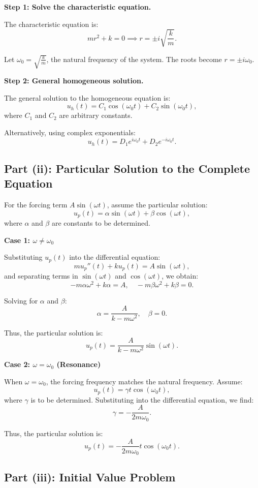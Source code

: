 \documentclass[a4paper]{report}
\begin{document}
\textbf{Step 1: Solve the characteristic equation.}

The characteristic equation is:
\[
	m r^2 + k = 0 \implies r = \pm i \sqrt{\frac{k}{m}}.
\]

Let \(\omega_0 = \sqrt{\frac{k}{m}}\), the natural frequency of the system. The roots become \(r = \pm i \omega_0\).

\textbf{Step 2: General homogeneous solution.}

The general solution to the homogeneous equation is:
\[
	u_h(t) = C_1 \cos(\omega_0 t) + C_2 \sin(\omega_0 t),
\]
where \(C_1\) and \(C_2\) are arbitrary constants.

Alternatively, using complex exponentials:
\[
	u_h(t) = D_1 e^{i\omega_0 t} + D_2 e^{-i\omega_0 t}.
\]

\subsection*{Part (ii): Particular Solution to the Complete Equation}

For the forcing term \(A \sin(\omega t)\), assume the particular solution:
\[
	u_p(t) = \alpha \sin(\omega t) + \beta \cos(\omega t),
\]
where \(\alpha\) and \(\beta\) are constants to be determined.

\textbf{Case 1: \(\omega \neq \omega_0\)}

Substituting \(u_p(t)\) into the differential equation:
\[
	m u_p''(t) + k u_p(t) = A \sin(\omega t),
\]
and separating terms in \(\sin(\omega t)\) and \(\cos(\omega t)\), we obtain:
\[
	-m \alpha \omega^2 + k \alpha = A, \quad -m \beta \omega^2 + k \beta = 0.
\]

Solving for \(\alpha\) and \(\beta\):
\[
	\alpha = \frac{A}{k - m \omega^2}, \quad \beta = 0.
\]

Thus, the particular solution is:
\[
	u_p(t) = \frac{A}{k - m \omega^2} \sin(\omega t).
\]

\textbf{Case 2: \(\omega = \omega_0\) (Resonance)}

When \(\omega = \omega_0\), the forcing frequency matches the natural frequency. Assume:
\[
	u_p(t) = \gamma t \cos(\omega_0 t),
\]
where \(\gamma\) is to be determined. Substituting into the differential equation, we find:
\[
	\gamma = -\frac{A}{2m \omega_0}.
\]

Thus, the particular solution is:
\[
	u_p(t) = -\frac{A}{2m \omega_0} t \cos(\omega_0 t).
\]

\subsection*{Part (iii): Initial Value Problem}
\end{document}

